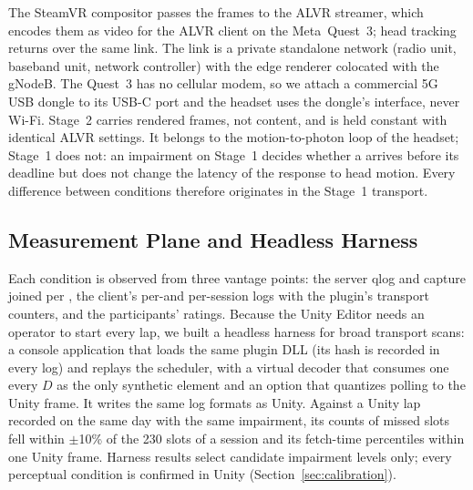 The SteamVR compositor passes the frames to the ALVR streamer, which
encodes them as video for the ALVR client on the Meta~Quest~3; head
tracking returns over the same link. The link is a private \fiveg
standalone network (radio unit, baseband unit, network controller)
with the edge renderer colocated with the gNodeB. The Quest~3 has no
cellular modem, so we attach a commercial 5G USB dongle to its USB-C
port and the headset uses the dongle's interface, never Wi-Fi.
Stage~2 carries rendered frames, not \vpcc content, and is held
constant with identical ALVR settings. It belongs to the
motion-to-photon loop of the headset; Stage~1 does not: an impairment
on Stage~1 decides whether a \gof arrives before its deadline but does
not change the latency of the response to head motion. Every
difference between conditions therefore originates in the Stage~1
transport.

\subsection{Measurement Plane and Headless Harness}
\label{sec:sys-measurement}

Each condition is observed from three vantage points: the server qlog
and capture joined per \gof, the client's per-\gof and per-session logs
with the plugin's transport counters, and the participants' ratings.
Because the Unity Editor needs an operator to start every lap, we
built a headless harness for broad transport scans: a console application that
loads the same plugin DLL (its hash is recorded in every log) and
replays the scheduler, with a virtual decoder that consumes one \gof
every $D$ as the only synthetic element and an option that quantizes
polling to the Unity frame. It writes the same log formats as Unity.
Against a Unity lap recorded on the same day with the same impairment,
its counts of missed slots fell within $\pm$10\% of the 230 slots of a
session and its fetch-time percentiles within one Unity frame. Harness
results select candidate impairment levels only; every perceptual
condition is confirmed in Unity (Section~\ref{sec:calibration}).

